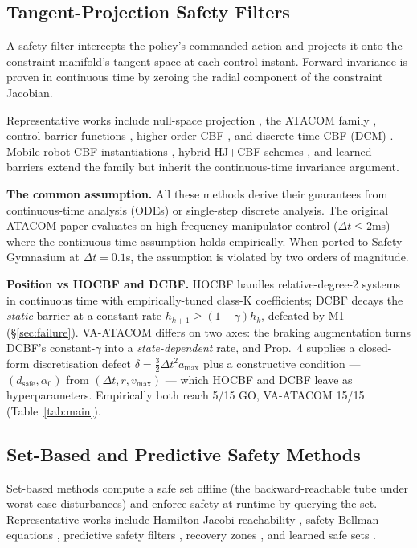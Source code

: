 \documentclass[letterpaper]{article}
\begin{document}
\subsection{Tangent-Projection Safety Filters}

A safety filter intercepts the policy's commanded action and projects it onto the constraint manifold's tangent space at each control instant. Forward invariance is proven in continuous time by zeroing the radial component of the constraint Jacobian.

Representative works include null-space projection \cite{khatib1987,sentis2005}, the ATACOM family \cite{liu2022,liu2024}, control barrier functions \cite{ames2014,ames2017}, higher-order CBF \cite{xiao2021}, and discrete-time CBF (DCM) \cite{agrawal2017}. Mobile-robot CBF instantiations \cite{cheng2019,taylor2020}, hybrid HJ$+$CBF schemes \cite{choi2020}, and learned barriers \cite{robey2020,lindemann2023} extend the family but inherit the continuous-time invariance argument.

\textbf{The common assumption.} All these methods derive their guarantees from continuous-time analysis (ODEs) or single-step discrete analysis. The original ATACOM paper evaluates on high-frequency manipulator control ($\Delta t \le 2$ms) where the continuous-time assumption holds empirically. When ported to Safety-Gymnasium at $\Delta t = 0.1$s, the assumption is violated by two orders of magnitude.

\textbf{Position vs HOCBF and DCBF.} HOCBF \cite{xiao2021} handles relative-degree-2 systems in continuous time with empirically-tuned class-K coefficients; DCBF \cite{agrawal2017} decays the \emph{static} barrier at a constant rate $h_{k+1} \ge (1{-}\gamma)h_k$, defeated by M1 (\S\ref{sec:failure}). VA-ATACOM differs on two axes: the braking augmentation turns DCBF's constant-$\gamma$ into a \emph{state-dependent} rate, and Prop.~4 supplies a closed-form discretisation defect $\delta{=}\tfrac{3}{2}\Delta t^2 a_{\max}$ plus a constructive condition --- $(d_\text{safe},\alpha_0)$ from $(\Delta t, r, v_{\max})$ --- which HOCBF and DCBF leave as hyperparameters. Empirically both reach 5/15 GO, VA-ATACOM 15/15 (Table~\ref{tab:main}).

\subsection{Set-Based and Predictive Safety Methods}

Set-based methods compute a safe set offline (the backward-reachable tube under worst-case disturbances) and enforce safety at runtime by querying the set. Representative works include Hamilton-Jacobi reachability \cite{mitchell2005,bansal2017}, safety Bellman equations \cite{fisac2018,fisac2019,hsu2021}, predictive safety filters \cite{wabersich2018,wabersich2021}, recovery zones \cite{thananjeyan2021}, and learned safe sets \cite{robey2020}.
\end{document}
